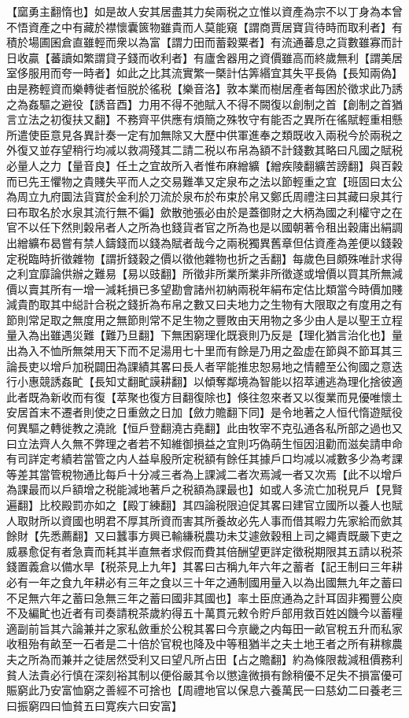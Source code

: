 【窳勇主翻惰也】如是故人安其居盡其力矣兩税之立惟以資產為宗不以丁身為本曾不悟資產之中有藏於襟懷囊篋物雖貴而人莫能窺【謂商賈居寶貨待時而取利者】有積於場圃囷倉直雖輕而衆以為富【謂力田而蓄穀粟者】有流通蕃息之貨數雖寡而計日收贏【蕃讀如繁謂貸子錢而收利者】有廬舍器用之資價雖高而終歲無利【謂美居室侈服用而夸一時者】如此之比其流實繁一槩計估筭緡宜其失平長偽【長知兩偽】由是務輕資而樂轉徙者恒脱於徭税【樂音洛】敦本業而樹居產者每困於徵求此乃誘之為姦驅之避役【誘音酉】力用不得不弛賦入不得不闕復以創制之首【創制之首猶言立法之初復扶又翻】不務齊平供應有煩簡之殊牧守有能否之異所在徭賦輕重相懸所遣使臣意見各異計奏一定有加無除又大歷中供軍進奉之類既收入兩税今於兩税之外復又並存望稍行均减以救凋殘其二請二税以布帛為額不計錢數其略曰凡國之賦税必量人之力【量音良】任土之宜故所入者惟布麻繒纊【繒疾陵翻纊苦謗翻】與百糓而已先王懼物之貴賤失平而人之交易難凖又定泉布之法以節輕重之宜【班固曰太公為周立九府圜法貨寶於金利於刀流於泉布於布束於帛又鄭氏周禮注曰其藏曰泉其行曰布取名於水泉其流行無不徧】歛散弛張必由於是蓋御財之大柄為國之利權守之在官不以任下然則糓帛者人之所為也錢貨者官之所為也是以國朝著令租出穀庸出絹調出繒纊布曷嘗有禁人鑄錢而以錢為賦者哉今之兩税獨異舊章但估資產為差便以錢穀定税臨時折徵雜物【謂折錢穀之價以徵他雜物也折之舌翻】每歲色目頗殊唯計求得之利宜靡論供辦之難易【易以豉翻】所徵非所業所業非所徵遂或增價以買其所無減價以賣其所有一增一減耗損已多望勘會諸州初納兩税年絹布定估比類當今時價加賤減貴酌取其中縂計合税之錢折為布帛之數又曰夫地力之生物有大限取之有度用之有節則常足取之無度用之無節則常不足生物之豐敗由天用物之多少由人是以聖王立程量入為出雖遇災難【難乃旦翻】下無困窮理化既衰則乃反是【理化猶言治化也】量出為入不恤所無桀用天下而不足湯用七十里而有餘是乃用之盈虚在節與不節耳其三論長吏以增戶加税闢田為課績其畧曰長人者罕能推忠恕易地之情體至公徇國之意迭行小惠競誘姦甿【長知丈翻甿謨耕翻】以傾奪鄰境為智能以招萃逋逃為理化捨彼適此者既為新收而有復【萃聚也復方目翻復除也】倏往忽來者又以復業而見優唯懷土安居首末不遷者則使之日重斂之日加【斂力贍翻下同】是令地著之人恒代惰遊賦役何異驅之轉徙教之澆訛【恒戶登翻澆古堯翻】此由牧宰不克弘通各私所部之過也又曰立法齊人久無不弊理之者若不知維御損益之宜則巧偽萌生恒因沮勸而滋矣請申命有司詳定考績若當管之内人益阜殷所定税額有餘任其據戶口均减以减數多少為考課等差其當管稅物通比每戶十分减三者為上課減二者次焉減一者又次焉【此不以增戶為課最而以戶額增之税能減地著戶之税額為課最也】如或人多流亡加税見戶【見賢遍翻】比校殿罰亦如之【殿丁練翻】其四論税限迫促其畧曰建官立國所以養人也賦人取財所以資國也明君不厚其所資而害其所養故必先人事而借其暇力先家給而歛其餘財【先悉薦翻】又曰蠶事方興已輸縑税農功未艾遽斂穀租上司之繩責既嚴下吏之威暴愈促有者急賣而耗其半直無者求假而費其倍酬望更詳定徵税期限其五請以税茶錢置義倉以備水旱【税茶見上九年】其畧曰古稱九年六年之蓄者【記王制曰三年耕必有一年之食九年耕必有三年之食以三十年之通制國用量入以為出國無九年之蓄曰不足無六年之蓄曰急無三年之蓄曰國非其國也】率土臣庶通為之計耳固非獨豐公庾不及編甿也近者有司奏請稅茶歲約得五十萬貫元敕令貯戶部用救百姓凶饑今以蓄糧適副前旨其六論兼并之家私斂重於公稅其畧曰今亰畿之内每田一畝官稅五升而私家收租殆有畝至一石者是二十倍於官稅也降及中等租猶半之夫土地王者之所有耕稼農夫之所為而兼并之徒居然受利又曰望凡所占田【占之贍翻】約為條限裁減租價務利貧人法貴必行慎在深刻裕其制以便俗嚴其令以懲違微損有餘稍優不足失不損富優可賑窮此乃安富恤窮之善經不可捨也【周禮地官以保息六養萬民一曰慈幼二曰養老三曰振窮四曰恤貧五曰寛疾六曰安富】

